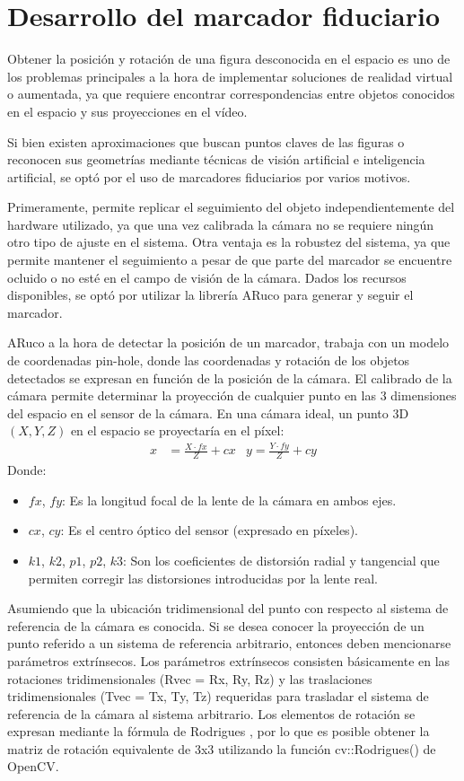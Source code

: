 \section{Desarrollo del marcador fiduciario}
Obtener la posición y rotación de una figura desconocida en el espacio es uno de los problemas principales a la hora de implementar soluciones de realidad virtual o aumentada, ya que requiere encontrar correspondencias entre objetos conocidos en el espacio y sus proyecciones en el vídeo.

Si bien existen aproximaciones que buscan puntos claves de las figuras o reconocen sus geometrías mediante técnicas de visión artificial e inteligencia artificial, se optó por el uso de  marcadores fiduciarios por varios motivos.

Primeramente, permite replicar el seguimiento del objeto independientemente del hardware utilizado, ya que una vez calibrada la cámara no se requiere ningún otro tipo de ajuste en el sistema. Otra ventaja es la robustez del sistema, ya que permite mantener el seguimiento a pesar de que parte del marcador se encuentre ocluido o no esté en el campo de visión de la cámara.
Dados los recursos disponibles, se optó por utilizar la librería ARuco para generar y seguir el marcador.

ARuco a la hora de detectar la posición de un marcador, trabaja con un modelo de coordenadas pin-hole, donde las coordenadas y rotación de los objetos detectados se expresan en función de la posición de la cámara.
El calibrado de la cámara permite determinar la proyección de cualquier punto en las 3 dimensiones del espacio en el sensor de la cámara. En una cámara ideal, un punto 3D $(X, Y, Z)$ en el espacio se proyectaría en el píxel:
\begin{align*}
x &= \frac{X \cdot fx}{Z} + cx & y = \frac{Y \cdot fy}{Z} + cy
\end{align*}
Donde:
\begin{itemize}
\item $fx$, $fy$: Es la longitud focal de la lente de la cámara en ambos ejes.
\item $cx$, $cy$: Es el centro óptico del sensor (expresado en píxeles).
\item $k1$, $k2$, $p1$, $p2$, $k3$: Son los coeficientes de distorsión radial y tangencial que permiten corregir las distorsiones introducidas por la lente real.
\end{itemize}
Asumiendo que la ubicación tridimensional del punto con respecto al sistema de referencia de la cámara es conocida. Si se desea conocer la proyección de un punto referido a un sistema de referencia arbitrario, entonces deben mencionarse parámetros extrínsecos. Los parámetros extrínsecos consisten básicamente en las rotaciones tridimensionales (Rvec = {Rx, Ry, Rz}) y las traslaciones tridimensionales (Tvec = {Tx, Ty, Tz}) requeridas para trasladar el sistema de referencia de la cámara al sistema arbitrario. Los elementos de rotación se expresan mediante la fórmula de Rodrigues \cite{mebius2007derivation}, por lo que es posible obtener la matriz de rotación equivalente de 3x3 utilizando la función cv::Rodrigues() de OpenCV.

